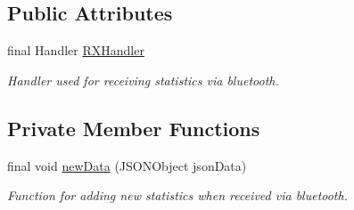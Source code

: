 \subsection*{Public Attributes}
\begin{DoxyCompactItemize}
\item 
final Handler \hyperlink{class_android_app_1_1_realtime_fragment_a6497ae268ff103aecc48a4bae15059d7}{R\+X\+Handler}
\begin{DoxyCompactList}\small\item\em Handler used for receiving statistics via bluetooth. \end{DoxyCompactList}\end{DoxyCompactItemize}
\subsection*{Private Member Functions}
\begin{DoxyCompactItemize}
\item 
final void \hyperlink{class_android_app_1_1_realtime_fragment_a61735e07c8f7b382b176d7cd7443de3f}{new\+Data} (J\+S\+O\+N\+Object json\+Data)
\begin{DoxyCompactList}\small\item\em Function for adding new statistics when received via bluetooth. \end{DoxyCompactList}\end{DoxyCompactItemize}
